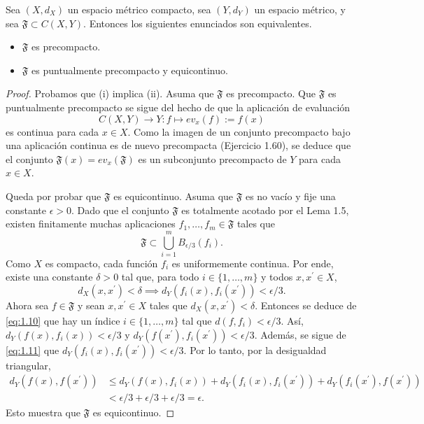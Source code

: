 \begin{theorem} \label{thm:1.11}
Sea $(X,d_{X})$ un espacio métrico compacto, sea $(Y,d_{Y})$ un espacio métrico, y sea $\mathfrak{F}\subset C(X,Y)$. Entonces los siguientes enunciados son equivalentes.
\begin{itemize}
    \item[(i)] $\mathfrak{F}$ es precompacto.
    \item[(ii)] $\mathfrak{F}$ es puntualmente precompacto y equicontinuo.
\end{itemize}
\end{theorem}
\begin{proof}
Probamos que (i) implica (ii). Asuma que $\mathfrak{F}$ es precompacto. Que $\mathfrak{F}$ es puntualmente precompacto se sigue del hecho de que la aplicación de evaluación
\[ C(X,Y)\rightarrow Y:f\mapsto ev_{x}(f):=f(x) \]
es continua para cada $x\in X$. Como la imagen de un conjunto precompacto bajo una aplicación continua es de nuevo precompacta (Ejercicio 1.60), se deduce que el conjunto $\mathfrak{F}(x)=ev_{x}(\mathfrak{F})$ es un subconjunto precompacto de $Y$ para cada $x\in X$.

Queda por probar que $\mathfrak{F}$ es equicontinuo. Asuma que $\mathfrak{F}$ es no vacío y fije una constante $\epsilon>0$. Dado que el conjunto $\mathfrak{F}$ es totalmente acotado por el Lema 1.5, existen finitamente muchas aplicaciones $f_{1},\dots,f_{m}\in\mathfrak{F}$ tales que
\begin{equation}\label{eq:1.10}
\mathfrak{F}\subset\bigcup_{i=1}^{m}B_{\epsilon/3}(f_{i}).
\end{equation}
Como $X$ es compacto, cada función $f_{i}$ es uniformemente continua. Por ende, existe una constante $\delta>0$ tal que, para todo $i\in\{1,\dots,m\}$ y todos $x, x^{\prime}\in X$,
\begin{equation}\label{eq:1.11}
d_{X}(x,x^{\prime})<\delta \implies d_{Y}(f_{i}(x),f_{i}(x^{\prime}))<\epsilon/3.
\end{equation}
Ahora sea $f\in\mathfrak{F}$ y sean $x,x^{\prime}\in X$ tales que $d_{X}(x,x^{\prime})<\delta$. Entonces se deduce de \eqref{eq:1.10} que hay un índice $i\in\{1,\dots,m\}$ tal que $d(f,f_{i})<\epsilon/3$. Así, $d_{Y}(f(x),f_{i}(x))<\epsilon/3$ y $d_{Y}(f(x^{\prime}),f_{i}(x^{\prime}))<\epsilon/3$. Además, se sigue de \eqref{eq:1.11} que $d_{Y}(f_{i}(x),f_{i}(x^{\prime}))<\epsilon/3$. Por lo tanto, por la desigualdad triangular,
\begin{align*}
d_{Y}(f(x),f(x^{\prime})) &\le d_{Y}(f(x),f_{i}(x))+d_{Y}(f_{i}(x),f_{i}(x^{\prime}))+d_{Y}(f_{i}(x^{\prime}),f(x^{\prime})) \\
&< \epsilon/3+\epsilon/3+\epsilon/3 = \epsilon.
\end{align*}
Esto muestra que $\mathfrak{F}$ es equicontinuo.


\end{proof}
